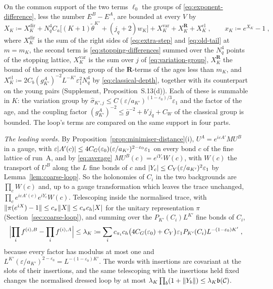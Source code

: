 \documentclass[11pt]{preprint}
\DeclarePairedDelimiter{\abs}{\lvert}{\rvert}
\DeclarePairedDelimiter{\norm}{\lVert}{\rVert}
\numberwithin{equation}{section}
\theoremstyle{definition}
\theoremstyle{remark}
\theoremstyle{plain}
\begin{document}
On the common support of the two terms $\ell_0$ the groups of \eqref{eq:exponent-difference}, less the number $E^B - E^A$, are bounded at every $V$ by
\begin{equation}\label{eq:x-k}
    X_K \coloneqq X^{\mathrm{dir}}_K + N_q^4C_a\bigl[(K + 1)\tilde\theta^{K'} + (j_q + 2)w_K\bigr] + X^{\mathrm{var}}_K + X^{\mathbf R}_K + X^{\mathrm{cl}}_K\;,
    \qquad
    x_K \coloneqq e^{X_K} - 1\;,
\end{equation}
where $X^{\mathrm{dir}}_K$ is the sum of the right sides of \eqref{eq:extra-step} and \eqref{eq:old-tail} at $m = m_K$, the second term is \eqref{eq:stopping-differences} summed over the $N_q^4$ points of the stopping lattice, $X^{\mathrm{var}}_K$ is the sum over $j$ of \eqref{eq:variation-group}, $X^{\mathbf R}_K$ the bound of the corresponding group of the $\mathbf R$-terms of the ages less than $m_K$, and $X^{\mathrm{cl}}_K \coloneqq 2C_b(g^A_{K'})^{-2}L^{-K'}\varepsilon_1^2N_q^4$ by \eqref{eq:classical-depth}, together with its counterpart on the young pairs (Supplement, Proposition~S.13(d)). Each of these is summable in $K$: the variation group by $\hat\sigma_{K',j} \leq C(\varepsilon/a_{K'})^{(1-\varepsilon_0)/3}\varepsilon_1$ and the factor of the age, and the coupling factor $(g^A_{K'})^{-2} \leq \bar g^{-2} + b'j_q + C_W$ of the classical group is bounded. The loop's terms are compared on the same support in four parts.

\emph{The leading words.} By Proposition~\ref{prop:minimiser-distance}(i), $U^A = e^{i\varepsilon A'}MU^B$ in a gauge, with $\varepsilon\abs{A'(c)} \leq 4C_G(\varepsilon_0)(\varepsilon/a_{K'})^{2-\varepsilon_0}\varepsilon_1$ on every bond $c$ of the fine lattice of run~A, and by \eqref{eq:average} $MU^B(c) = e^{iY_c}W(c)$, with $W(c)$ the transport of $U^B$ along the $L$ fine bonds of $c$ and $\abs{Y_c} \leq C_Y(\varepsilon/a_{K'})^2\varepsilon_1$ by Lemma~\ref{lem:coarse-loop}. So the holonomies of $C_i$ in the two backgrounds are $\prod_cW(c)$ and, up to a gauge transformation which leaves the trace unchanged, $\prod_ce^{i\varepsilon A'(c)}e^{iY_c}W(c)$. Telescoping inside the normalised trace, with $\norm{\pi(e^{iX}) - 1} \leq c_\pi\norm{X} \leq c_\pi c_h\abs{X}$ for the unitary representation $\pi$ (Section~\ref{sec:coarse-loop}), and summing over the $P_{K'}(C_i)L^{K'}$ fine bonds of $C_i$,
\begin{equation}\label{eq:leading-word-difference}
    \Bigl\lvert\prod_if^{(i),B} - \prod_if^{(i),A}\Bigr\rvert \leq \lambda_K \coloneqq \sum_ic_{\pi_i}c_h\bigl(4C_G(\varepsilon_0) + C_Y\bigr)\varepsilon_1P_{K'}(C_i)L^{-(1-\varepsilon_0)K'}\;,
\end{equation}
because every factor has modulus at most one and $L^{K'}(\varepsilon/a_{K'})^{2-\varepsilon_0} = L^{-(1-\varepsilon_0)K'}$. The words with insertions are covariant at the slots of their insertions, and the same telescoping with the insertions held fixed changes the normalised dressed loop by at most $\lambda_K\prod_b(1 + \norm{Y_b}) \leq \lambda_K\mathfrak b(\mathcal C)$.
\end{document}
